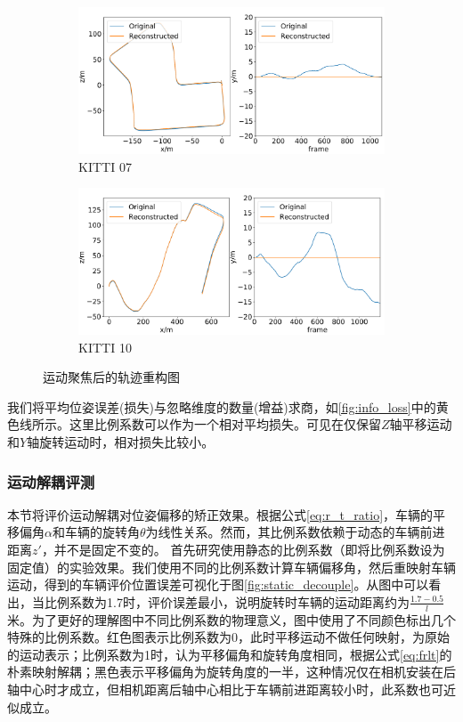 \begin{figure}[ht]
    \centering
    \begin{subfigure}[b]{0.48\textwidth}
    \includegraphics[width=\textwidth]{datavo/path_recon_07.pdf}
    \caption{KITTI 07}
    \label{fig:recon_07}
    \end{subfigure}
    \begin{subfigure}[b]{0.48\textwidth}
        \includegraphics[width=\textwidth]{datavo/path_recon_10.pdf}
        \caption{KITTI 10}
        \label{fig:recon_10}
    \end{subfigure}
    \caption{运动聚焦后的轨迹重构图} 
    \label{fig:path_recon}
\end{figure}
我们将平均位姿误差(损失)与忽略维度的数量(增益)求商，如\ref{fig:info_loss}中的黄色线所示。这里比例系数可以作为一个相对平均损失。可见在仅保留$Z$轴平移运动和$Y$轴旋转运动时，相对损失比较小。


\subsubsection{运动解耦评测}
\label{sec:info_decouple}
本节将评价运动解耦对位姿偏移的矫正效果。根据公式\eqref{eq:r_t_ratio}，车辆的平移偏角$\alpha$和车辆的旋转角$\theta$为线性关系。然而，其比例系数依赖于动态的车辆前进距离$z'$，并不是固定不变的。
首先研究使用静态的比例系数（即将比例系数设为固定值）的实验效果。我们使用不同的比例系数计算车辆偏移角，然后重映射车辆运动，得到的车辆评价位置误差可视化于图\ref{fig:static_decouple}。从图中可以看出，当比例系数为1.7时，评价误差最小，说明旋转时车辆的运动距离约为$\frac{1.7-0.5}{l}$米。为了更好的理解图中不同比例系数的物理意义，图中使用了不同颜色标出几个特殊的比例系数。红色图表示比例系数为0，此时平移运动不做任何映射，为原始的运动表示；比例系数为1时，认为平移偏角和旋转角度相同，根据公式\eqref{eq:frlt}的朴素映射解耦；黑色表示平移偏角为旋转角度的一半，这种情况仅在相机安装在后轴中心时才成立，但相机距离后轴中心相比于车辆前进距离较小时，此系数也可近似成立。

